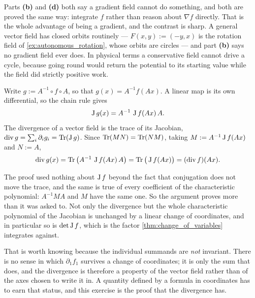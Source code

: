 \begin{exercisesolution}
\begin{remark}
Parts \textbf{(b)} and \textbf{(d)} both say a gradient field cannot do something, and both are
proved the same way: integrate $f$ rather than reason about $\nabla f$ directly. That is the
whole advantage of being a gradient, and the contrast is sharp. A general vector field has closed
orbits routinely --- $F(x,y) := (-y,x)$ is the rotation field of \cref{ex:autonomous_rotation},
whose orbits are circles --- and part \textbf{(b)} says no gradient field ever does. In physical
terms a conservative field cannot drive a cycle, because going round would return the potential
to its starting value while the field did strictly positive work.
\end{remark}
\end{exercisesolution}

\begin{exercisesolution}
\label{sol:divergence_under_conjugation}
Write $g := A^{-1}\circ f\circ A$, so that $g(x) = A^{-1}f(Ax)$. A linear map is its own
differential, so the chain rule gives
\[\operatorname{J} g(x) = A^{-1}\,\operatorname{J} f(Ax)\,A .\]
The divergence of a vector field is the trace of its Jacobian, $\operatorname{div} g = \sum_i \partial_i g_i =
\operatorname{Tr}(\operatorname{J} g)$. Since $\operatorname{Tr}(MN) = \operatorname{Tr}(NM)$, taking $M := A^{-1}\operatorname{J} f(Ax)$ and $N := A$,
\[\operatorname{div} g(x) = \operatorname{Tr}\big(A^{-1}\,\operatorname{J} f(Ax)\,A\big) = \operatorname{Tr}\big(\operatorname{J} f(Ax)\big) = (\operatorname{div} f)(Ax) .\]

\begin{remark}
The proof used nothing about $\operatorname{J} f$ beyond the fact that conjugation does not move the trace,
and the same is true of every coefficient of the characteristic polynomial: $A^{-1}MA$ and $M$
have the same one. So the argument proves more than it was asked to. Not only the divergence but
the whole characteristic polynomial of the Jacobian is unchanged by a linear change of
coordinates, and in particular so is $\det \operatorname{J} f$, which is the factor
\cref{thm:change_of_variables} integrates against.

That is worth knowing because the individual summands are \emph{not} invariant. There is no sense
in which $\partial_1 f_1$ survives a change of coordinates; it is only the sum that does, and the
divergence is therefore a property of the vector field rather than of the axes chosen to write it
in. A quantity defined by a formula in coordinates has to earn that status, and this exercise is
the proof that the divergence has.
\end{remark}
\end{exercisesolution}

